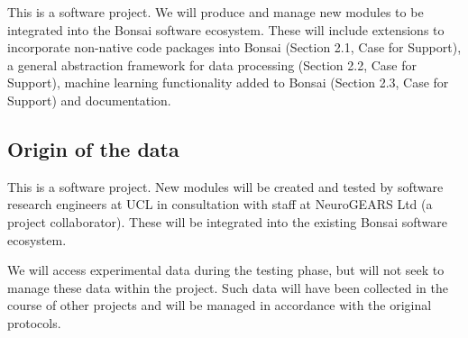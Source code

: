 \documentclass[a4paper,11pt]{article}
\begin{document}

This is a software project.  We will produce and manage new modules to be
integrated into the Bonsai software ecosystem.  These will include extensions
to incorporate non-native code packages into Bonsai (Section 2.1, Case for
Support), a general abstraction framework for data processing (Section 2.2,
Case for Support), machine learning functionality added to Bonsai (Section 2.3,
Case for Support) and documentation.


\subsection{Origin of the data}


This is a software project.  New modules will be created and tested by software research engineers at UCL in consultation with staff at NeuroGEARS Ltd (a project collaborator).  These will be integrated into the existing Bonsai software ecosystem.

We will access experimental data during the testing phase, but will not seek to manage these data within the project.  Such data will have been collected in the course of other projects and will be managed in accordance with the original protocols. 

\end{document}
